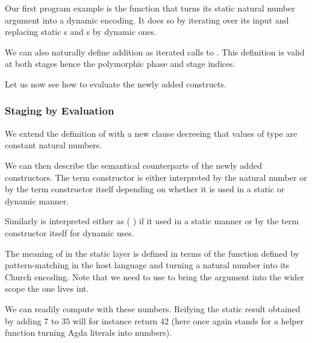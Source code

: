 Our first program example is the function  that
turns its static natural number argument into a dynamic
encoding. It does so by iterating over its input and replacing
static s and s by dynamic ones.


We can also naturally define addition as iterated calls to
. This definition is valid at both stages hence
the polymorphic phase and stage indices.

\label{def:add}

Let us now see how to evaluate the newly added constructs.

\subsubsection{Staging by Evaluation}

We extend the definition of  with a new clause decreeing
that values of type  are constant natural numbers.


We can then describe the semantical counterparts of the newly
added constructors.
%
The term constructor  is either interpreted by
the natural number  or by the term constructor itself
depending on whether it is used in a static or dynamic manner.


Similarly  is interpreted either as ( \AF{+}\AS{\_})
if it used in a static manner or by the term constructor itself
for dynamic uses.


The meaning of  in the static layer is defined in
terms of the  function defined by pattern-matching
in the host language and turning a natural number into its
Church encoding. Note that we need to use  to
bring the  argument into the wider scope the 
one lives int.



We can readily compute with these numbers. Reifying the static
result obtained by adding $7$ to $35$ will for instance return
$42$ (here  once again stands for a helper function
turning Agda literals into  numbers).


